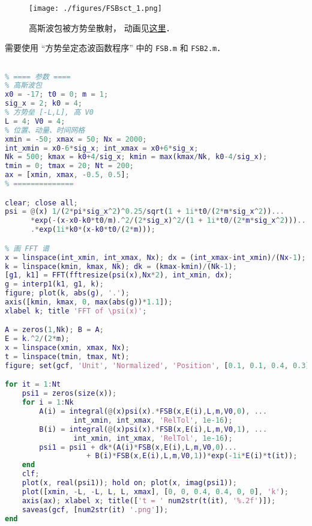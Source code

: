 
\begin{issues}
\issueDraft
{}
\end{issues}


\begin{figure}[ht]
\centering
\texttt{[image: ./figures/FSBsct\_1.png]}
\caption{高斯波包被方势垒散射， 动画见\href{https://wuli.wiki/apps/FSBsct.html}{这里}．} \label{FSBsct_fig1}
\end{figure}

需要使用 “方势垒定态波函数程序” 中的 \verb|FSB.m| 和 \verb|FSB2.m|．
\begin{lstlisting}[language=matlab, caption=FSBsct.m]
% 方势垒散射高斯波包， 使用类 sin，cos 基底

% ==== 参数 ====
% 高斯波包
x0 = -17; t0 = 0; m = 1;
sig_x = 2; k0 = 4;
% 方势垒 [-L,L], 高 V0
L = 4; V0 = 4;
% 位置、动量、时间网格
xmin = -50; xmax = 50; Nx = 2000;
int_xmin = x0-6*sig_x; int_xmax = x0+6*sig_x;
Nk = 500; kmax = k0+4/sig_x; kmin = max(kmax/Nk, k0-4/sig_x);
tmin = 0; tmax = 20; Nt = 200;
ax = [xmin, xmax, -0.5, 0.5];
% ==============

clear; close all;
psi = @(x) 1/(2*pi*sig_x^2)^0.25/sqrt(1 + 1i*t0/(2*m*sig_x^2))...
      *exp(-(x-x0-k0*t0/m).^2/(2*sig_x)^2/(1 + 1i*t0/(2*m*sig_x^2)))...
      .*exp(1i*k0*(x-k0*t0/(2*m)));

% 画 FFT 谱
x = linspace(int_xmin, int_xmax, Nx); dx = (int_xmax-int_xmin)/(Nx-1);
k = linspace(kmin, kmax, Nk); dk = (kmax-kmin)/(Nk-1);
[g1, k1] = FFT(fftresize(psi(x),Nx*2), int_xmin, dx);
g = interp1(k1, g1, k);
figure; plot(k, abs(g), '.');
axis([kmin, kmax, 0, max(abs(g))*1.1]);
xlabel k; title 'FFT of \psi(x)';

A = zeros(1,Nk); B = A;
E = k.^2/(2*m);
x = linspace(xmin, xmax, Nx);
t = linspace(tmin, tmax, Nt);
figure; set(gcf, 'Unit', 'Normalized', 'Position', [0.1, 0.1, 0.4, 0.3]);

for it = 1:Nt
    psi1 = zeros(size(x));
    for i = 1:Nk
        A(i) = integral(@(x)psi(x).*FSB(x,E(i),L,m,V0,0), ...
                int_xmin, int_xmax, 'RelTol', 1e-16);
        B(i) = integral(@(x)psi(x).*FSB(x,E(i),L,m,V0,1), ...
                int_xmin, int_xmax, 'RelTol', 1e-16);
        psi1 = psi1 + dk*(A(i)*FSB(x,E(i),L,m,V0,0)...
                   + B(i)*FSB(x,E(i),L,m,V0,1))*exp(-1i*E(i)*t(it));
    end
    clf;
    plot(x, real(psi1)); hold on; plot(x, imag(psi1));
    plot([xmin, -L, -L, L, L, xmax], [0, 0, 0.4, 0.4, 0, 0], 'k');
    axis(ax); xlabel x; title(['t = ' num2str(t(it), '%.2f')]);
    saveas(gcf, [num2str(it) '.png']);
end
\end{lstlisting}

